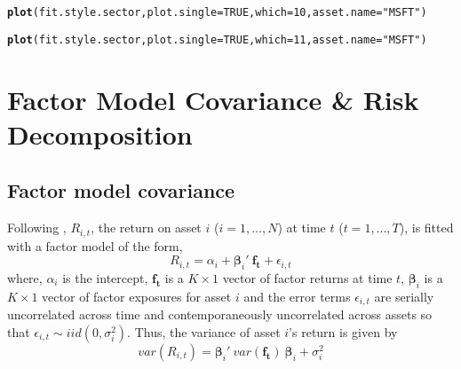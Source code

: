 \documentclass[a4paper]{article}\usepackage[]{graphicx}\usepackage[]{color}
\makeatletter
\newcommand{\hlnum}[1]{\textcolor[rgb]{0.686,0.059,0.569}{#1}}%
\newcommand{\hlstr}[1]{\textcolor[rgb]{0.192,0.494,0.8}{#1}}%
\newcommand{\hlstd}[1]{\textcolor[rgb]{0.345,0.345,0.345}{#1}}%
\newcommand{\hlkwc}[1]{\textcolor[rgb]{0.333,0.667,0.333}{#1}}%
\newcommand{\hlkwd}[1]{\textcolor[rgb]{0.737,0.353,0.396}{\textbf{#1}}}%
\newenvironment{kframe}{%
 \def\at@end@of@kframe{}%
 \ifinner\ifhmode%
  \def\at@end@of@kframe{\end{minipage}}%
  \begin{minipage}{\columnwidth}%
 \fi\fi%
 \def\FrameCommand##1{\hskip\@totalleftmargin \hskip-\fboxsep
 \colorbox{shadecolor}{##1}\hskip-\fboxsep
     \hskip-\linewidth \hskip-\@totalleftmargin \hskip\columnwidth}%
 \MakeFramed {\advance\hsize-\width
   \@totalleftmargin\z@ \linewidth\hsize
   \@setminipage}}%
 {\par\unskip\endMakeFramed%
 \at@end@of@kframe}
\newenvironment{knitrout}{}{} %
\makeatother
\begin{document}
\begin{knitrout}
\color{fgcolor}\begin{kframe}
\begin{alltt}
\hlkwd{plot}\hlstd{(fit.style.sector,} \hlkwc{plot.single}\hlstd{=}\hlnum{TRUE}\hlstd{,} \hlkwc{which}\hlstd{=}\hlnum{10}\hlstd{,} \hlkwc{asset.name}\hlstd{=}\hlstr{"MSFT"}\hlstd{)}
\end{alltt}


{\ttfamily\noindent\bfseries\color{errorcolor}{\#\# Error in xy.coords(x, y, xlabel, ylabel, log): 'x' is a list, but does not have components 'x' and 'y'}}\end{kframe}
\end{knitrout}

\begin{knitrout}
\color{fgcolor}\begin{kframe}
\begin{alltt}
\hlkwd{plot}\hlstd{(fit.style.sector,} \hlkwc{plot.single}\hlstd{=}\hlnum{TRUE}\hlstd{,} \hlkwc{which}\hlstd{=}\hlnum{11}\hlstd{,} \hlkwc{asset.name}\hlstd{=}\hlstr{"MSFT"}\hlstd{)}
\end{alltt}


{\ttfamily\noindent\bfseries\color{errorcolor}{\#\# Error in xy.coords(x, y, xlabel, ylabel, log): 'x' is a list, but does not have components 'x' and 'y'}}\end{kframe}
\end{knitrout}

\newpage
\section{Factor Model Covariance \& Risk Decomposition}

\subsection{Factor model covariance}

Following \citet{zivot2006modeling}, $R_{i, t}$, the return on asset $i$ ($i = 1, ..., N$) at time $t$ ($t = 1, ..., T$), is fitted with a factor model of the form,
\begin{equation}
R_{i,t} = \alpha_i + \bm\beta_i' \: \mathbf{f_t} + \epsilon_{i,t}
\end{equation}
where, $\alpha_i$ is the intercept, $\mathbf{f_t}$ is a $K \times 1$ vector of factor returns at time $t$, $\bm\beta_i$ is a $K \times 1$ vector of factor exposures for asset $i$ and the error terms $\epsilon_{i,t}$ are serially uncorrelated across time and contemporaneously uncorrelated across assets so that $\epsilon_{i,t} \sim iid(0, \sigma_i^2)$. Thus, the variance of asset $i$'s return is given by
\begin{equation}
var(R_{i,t}) = \bm\beta_i'\: var(\mathbf{f_t})\: \bm\beta_i + \sigma_i^2
\end{equation}
\end{document}
